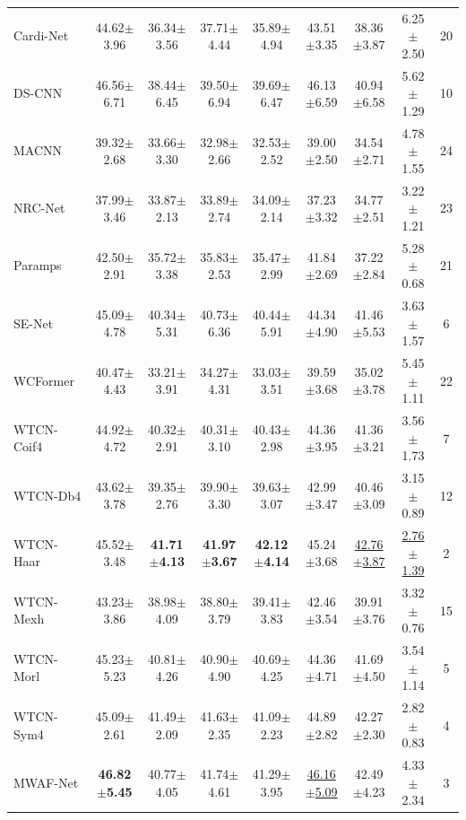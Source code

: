 \begin{table}[H]
\begin{tabular*}{\linewidth}{@{\extracolsep{\fill}}lcccccccc@{}}
Cardi-Net~\cite{Cardi-Net} & 44.62$\pm$3.96 & 36.34$\pm$3.56 & 37.71$\pm$4.44 & 35.89$\pm$4.94 & 43.51$\pm$3.35 & 38.36$\pm$3.87 & 6.25$\pm$2.50 & 20\\
DS-CNN~\cite{DS-CNN} & 46.56$\pm$6.71 & 38.44$\pm$6.45 & 39.50$\pm$6.94 & 39.69$\pm$6.47 & 46.13$\pm$6.59 & 40.94$\pm$6.58 & 5.62$\pm$1.29 & 10\\
MACNN~\cite{chen2021multi} & 39.32$\pm$2.68 & 33.66$\pm$3.30 & 32.98$\pm$2.66 & 32.53$\pm$2.52 & 39.00$\pm$2.50 & 34.54$\pm$2.71 & 4.78$\pm$1.55 & 24\\
NRC-Net~\cite{NRC-Net} & 37.99$\pm$3.46 & 33.87$\pm$2.13 & 33.89$\pm$2.74 & 34.09$\pm$2.14 & 37.23$\pm$3.32 & 34.77$\pm$2.51 & 3.22$\pm$1.21 & 23\\
Paramps~\cite{Paramps} & 42.50$\pm$2.91 & 35.72$\pm$3.38 & 35.83$\pm$2.53 & 35.47$\pm$2.99 & 41.84$\pm$2.69 & 37.22$\pm$2.84 & 5.28$\pm$0.68 & 21\\
SE-Net~\cite{SE-Net} & 45.09$\pm$4.78 & 40.34$\pm$5.31 & 40.73$\pm$6.36 & 40.44$\pm$5.91 & 44.34$\pm$4.90 & 41.46$\pm$5.53 & 3.63$\pm$1.57 & 6\\
WCFormer~\cite{WCFormer} & 40.47$\pm$4.43 & 33.21$\pm$3.91 & 34.27$\pm$4.31 & 33.03$\pm$3.51 & 39.59$\pm$3.68 & 35.02$\pm$3.78 & 5.45$\pm$1.11 & 22\\
\midrule
WTCN-Coif4 & 44.92$\pm$4.72 & 40.32$\pm$2.91 & 40.31$\pm$3.10 & 40.43$\pm$2.98 & 44.36$\pm$3.95 & 41.36$\pm$3.21 & 3.56$\pm$1.73 & 7\\
WTCN-Db4 & 43.62$\pm$3.78 & 39.35$\pm$2.76 & 39.90$\pm$3.30 & 39.63$\pm$3.07 & 42.99$\pm$3.47 & 40.46$\pm$3.09 & 3.15$\pm$0.89 & 12\\
WTCN-Haar & 45.52$\pm$3.48 & \textbf{41.71$\pm$4.13} & \textbf{41.97$\pm$3.67} & \textbf{42.12$\pm$4.14} & 45.24$\pm$3.68 & \underline{42.76$\pm$3.87} & \underline{2.76$\pm$1.39} & 2\\
WTCN-Mexh & 43.23$\pm$3.86 & 38.98$\pm$4.09 & 38.80$\pm$3.79 & 39.41$\pm$3.83 & 42.46$\pm$3.54 & 39.91$\pm$3.76 & 3.32$\pm$0.76 & 15\\
WTCN-Morl & 45.23$\pm$5.23 & 40.81$\pm$4.26 & 40.90$\pm$4.90 & 40.69$\pm$4.25 & 44.36$\pm$4.71 & 41.69$\pm$4.50 & 3.54$\pm$1.14 & 5\\
WTCN-Sym4 & 45.09$\pm$2.61 & 41.49$\pm$2.09 & 41.63$\pm$2.35 & 41.09$\pm$2.23 & 44.89$\pm$2.82 & 42.27$\pm$2.30 & 2.82$\pm$0.83 & 4\\
\midrule
MWAF-Net & \textbf{46.82$\pm$5.45} & 40.77$\pm$4.05 & 41.74$\pm$4.61 & 41.29$\pm$3.95 & \underline{46.16$\pm$5.09} & 42.49$\pm$4.23 & 4.33$\pm$2.34 & 3\\
\bottomrule\end{tabular*}
\endgroup
{}
\end{table}

